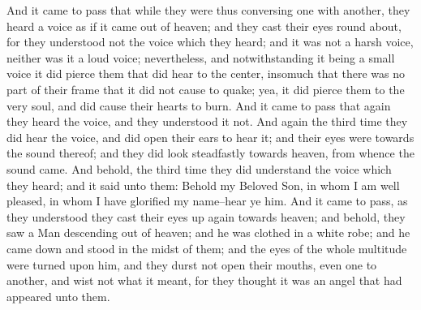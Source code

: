 And it came to pass that while they were thus conversing one with another, they heard a voice as if it came out of heaven; and they cast their eyes round about, for they understood not the voice which they heard; and it was not a harsh voice, neither was it a loud voice; nevertheless, and notwithstanding it being a small voice it did pierce them that did hear to the center, insomuch that there was no part of their frame that it did not cause to quake; yea, it did pierce them to the very soul, and did cause their hearts to burn.
\bverse \iffalse And it came to pass that again they heard the voice, and they understood it not. \fi
And it came to pass that again they heard the voice, and they understood it not.
\bverse \iffalse And again the third time they did hear the voice, and did open their ears to hear it; and their eyes were towards the sound thereof; and they did look steadfastly towards heaven, from whence the sound came. \fi
And again the third time they did hear the voice, and did open their ears to hear it; and their eyes were towards the sound thereof; and they did look steadfastly towards heaven, from whence the sound came.
\bverse \iffalse And behold, the third time they did understand the voice which they heard; and it said unto them: \fi
And behold, the third time they did understand the voice which they heard; and it said unto them:
\bverse \iffalse Behold my Beloved Son, in whom I am well pleased, in whom I have glorified my name--hear ye him. \fi
Behold my Beloved Son, in whom I am well pleased, in whom I have glorified my name--hear ye him.
\bverse \iffalse And it came to pass, as they understood they cast their eyes up again towards heaven; and behold, they saw a Man descending out of heaven; and he was clothed in a white robe; and he came down and stood in the midst of them; and the eyes of the whole multitude were turned upon him, and they durst not open their mouths, even one to another, and wist not what it meant, for they thought it was an angel that had appeared unto them. \fi
And it came to pass, as they understood they cast their eyes up again towards heaven; and behold, they saw a Man descending out of heaven; and he was clothed in a white robe; and he came down and stood in the midst of them; and the eyes of the whole multitude were turned upon him, and they durst not open their mouths, even one to another, and wist not what it meant, for they thought it was an angel that had appeared unto them.
\bverse \iffalse And it came to pass that he stretched forth his hand and spake unto the people, saying: \fi
